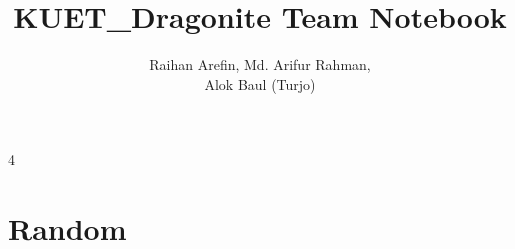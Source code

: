 \documentclass[8pt, a4paper, onesided]{article}
\title{\vspace{-2.5ex}KUET\_Dragonite Team Notebook}
\author{Raihan Arefin, Md. Arifur Rahman, \\Alok Baul (Turjo)}
\date{}
\begin{document}
\begin{landscape}
\begin{multicols*}{4}

\maketitle
\vspace{-7ex}
\tableofcontents
\pagestyle{fancy}
 
\raggedbottom


\section{Random}
    
\end{multicols*}


\end{landscape}
\end{document}
